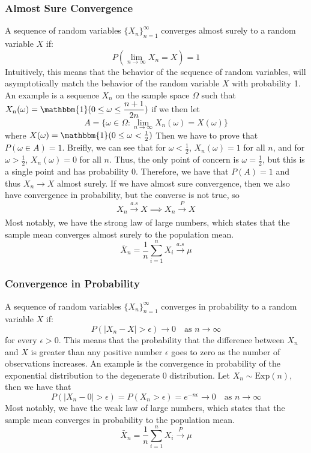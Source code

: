 \documentclass{article}
\theoremstyle{definition}
\theoremstyle{remark}
\begin{document}
\subsubsection{Almost Sure Convergence}
A sequence of random variables $\{X_n\}_{n=1}^{\infty}$ converges almost surely to a random variable $X$ if:
\begin{equation}
    P\left(\lim_{n \to \infty} X_n = X\right) = 1
\end{equation}
Intuitively, this means that the behavior of the sequence of random variables, will asymptotically match the behavior of the random variable $X$ with probability 1. An example is a sequence $X_n$ on the sample space $\Omega$ such that $X_n(\omega) = \mathbbm{1}(0\leq \omega \leq \dfrac{n+1}{2n})$ if we then let 
$$
A = \{\omega \in \Omega : \lim_{n \to \infty} X_n(\omega) = X(\omega)\}
$$
where $X(\omega) = \mathbbm{1}(0\leq \omega < \frac{1}{2})$ Then we have to prove that $P(\omega \in A) = 1$. Breifly, we can see that for $\omega < \frac{1}{2}$, $X_n(\omega) = 1$ for all $n$, and for $\omega > \frac{1}{2}$, $X_n(\omega) = 0$ for all $n$. Thus, the only point of concern is $\omega = \frac{1}{2}$, but this is a single point and has probability 0. Therefore, we have that $P(A) = 1$ and thus $X_n \to X$ almost surely. If we have almost sure convergence, then we also have convergence in probability, but the converse is not true, so
$$X_n \xrightarrow[]{a.s} X \implies X_n \xrightarrow[]{P} X$$
Most notably, we have the strong law of large numbers, which states that the sample mean converges almost surely to the population mean.
\begin{equation}
    \bar{X}_n = \dfrac{1}{n} \sum_{i=1}^{n} X_i \xrightarrow[]{a.s} \mu
\end{equation}

\subsubsection{Convergence in Probability}
A sequence of random variables $\{X_n\}_{n=1}^{\infty}$ converges in probability to a random variable $X$ if:
\begin{equation}
    P\left(\left|X_n - X\right| > \epsilon\right) \to 0 \quad \text{as } n \to \infty
\end{equation}
for every $\epsilon > 0$. This means that the probability that the difference between $X_n$ and $X$ is greater than any positive number $\epsilon$ goes to zero as the number of observations increases. An example is the convergence in probability of the exponential distribution to the degenerate 0 distribution. Let $X_n \sim \text{Exp}(n)$, then we have that
\begin{equation}
    P\left(\left|X_n - 0\right| > \epsilon\right) = P(X_n > \epsilon) = e^{-n\epsilon} \to 0 \quad \text{as } n \to \infty
\end{equation}
Most notably, we have the weak law of large numbers, which states that the sample mean converges in probability to the population mean. 
\begin{equation}
    \bar{X}_n = \dfrac{1}{n} \sum_{i=1}^{n} X_i \xrightarrow[]{P} \mu
\end{equation}
\end{document}
